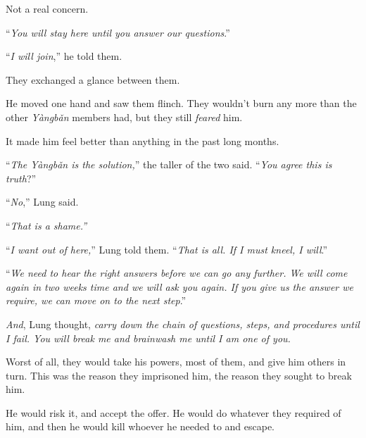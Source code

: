 Not a real concern.



``\emph{You will stay here until you answer our questions}.''



``\emph{I will join},'' he told them.



They exchanged a glance between them.



He moved one hand and saw them flinch.  They wouldn't burn any more than the other \emph{Y\`{a}ngb\v{a}n} members had, but they still \emph{feared }him.



It made him feel better than anything in the past long months.



``\emph{The Y\`{a}ngb\v{a}n is the solution,}'' the taller of the two said.  ``\emph{You agree this is truth}?''



``\emph{No},'' Lung said.



``\emph{That is a shame.''}



``\emph{I want out of here,}'' Lung told them.  ``\emph{That is all.  If I must kneel, I will}.''



``\emph{We need to hear the right answers before we can go any further.  We will come again in two weeks time and we will ask you again.  If you give us the answer we require, we can move on to the next step}.''



\emph{And}, Lung thought, \emph{carry down the chain of questions, steps, and procedures until I fail.  You will break me and brainwash me until I am one of you.}



Worst of all, they would take his powers, most of them, and give him others in turn.  This was the reason they imprisoned him, the reason they sought to break him.



He would risk it, and accept the offer.  He would do whatever they required of him, and then he would kill whoever he needed to and escape.



\sectionbreak






